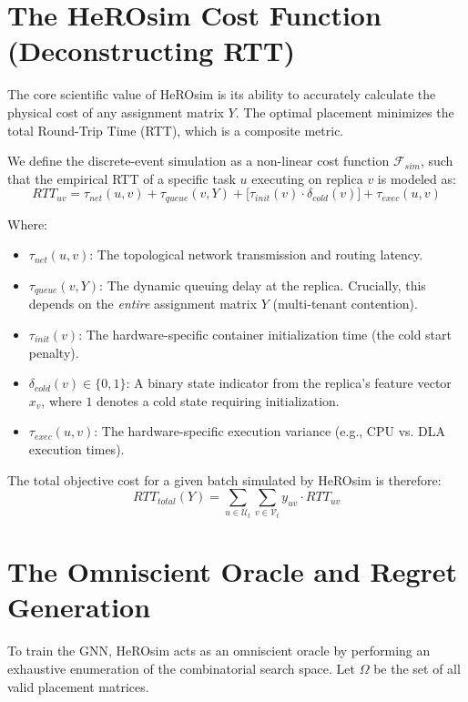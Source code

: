 \documentclass[11pt]{article}
\begin{document}
\section{The HeROsim Cost Function (Deconstructing RTT)}
The core scientific value of HeROsim is its ability to accurately calculate the physical cost of any assignment matrix $Y$. The optimal placement minimizes the total Round-Trip Time (RTT), which is a composite metric. 

We define the discrete-event simulation as a non-linear cost function $\mathcal{F}_{sim}$, such that the empirical RTT of a specific task $u$ executing on replica $v$ is modeled as:
\begin{equation}
RTT_{uv} = \tau_{net}(u,v) + \tau_{queue}(v, Y) + \big[\tau_{init}(v) \cdot \delta_{cold}(v)\big] + \tau_{exec}(u,v)
\end{equation}

Where:
\begin{itemize}
    \item $\tau_{net}(u,v)$: The topological network transmission and routing latency.
    \item $\tau_{queue}(v, Y)$: The dynamic queuing delay at the replica. Crucially, this depends on the \textit{entire} assignment matrix $Y$ (multi-tenant contention).
    \item $\tau_{init}(v)$: The hardware-specific container initialization time (the cold start penalty).
    \item $\delta_{cold}(v) \in \{0,1\}$: A binary state indicator from the replica's feature vector $x_v$, where $1$ denotes a cold state requiring initialization.
    \item $\tau_{exec}(u,v)$: The hardware-specific execution variance (e.g., CPU vs. DLA execution times).
\end{itemize}

The total objective cost for a given batch simulated by HeROsim is therefore:
\begin{equation}
RTT_{total}(Y) = \sum_{u \in \mathcal{U}_t} \sum_{v \in \mathcal{V}_t} y_{uv} \cdot RTT_{uv}
\end{equation}

\section{The Omniscient Oracle and Regret Generation}
To train the GNN, HeROsim acts as an omniscient oracle by performing an exhaustive enumeration of the combinatorial search space. Let $\Omega$ be the set of all valid placement matrices. 
\end{document}
